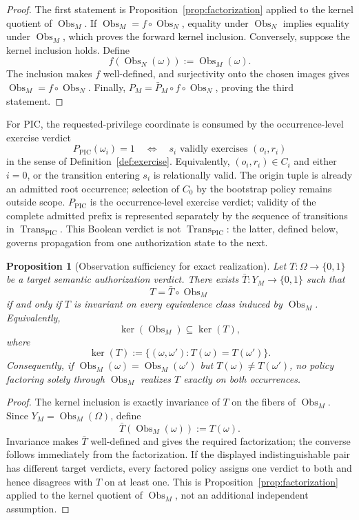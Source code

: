 \documentclass[10pt,twocolumn]{article}
\newtheorem{proposition}{Proposition}
\begin{document}
\begin{proof}
The first statement is Proposition~\ref{prop:factorization} applied to the
kernel quotient of \(\operatorname{Obs}_M\). If
\(\operatorname{Obs}_M=f\circ\operatorname{Obs}_N\), equality under
\(\operatorname{Obs}_N\) implies equality under \(\operatorname{Obs}_M\),
which proves the forward kernel inclusion. Conversely, suppose the kernel
inclusion holds. Define
\[
f(\operatorname{Obs}_N(\omega)):=\operatorname{Obs}_M(\omega).
\]
The inclusion makes \(f\) well-defined, and surjectivity onto the chosen images
gives \(\operatorname{Obs}_M=f\circ\operatorname{Obs}_N\). Finally,
\(P_M=\bar P_M\circ f\circ\operatorname{Obs}_N\), proving the third statement.
\end{proof}

For PIC, the requested-privilege coordinate is consumed by the occurrence-level
exercise verdict
\[
P_{\mathrm{PIC}}(\omega_i)=1
\quad\Longleftrightarrow\quad
s_i\text{ validly exercises }(o_i,r_i)
\]
in the sense of Definition~\ref{def:exercise}. Equivalently,
\((o_i,r_i)\in C_i\) and either \(i=0\), or the transition entering \(s_i\) is
relationally valid. The origin tuple is already an admitted root occurrence;
selection of \(C_0\) by the bootstrap policy remains outside scope.
\(P_{\mathrm{PIC}}\) is the occurrence-level exercise verdict; validity of the
complete admitted prefix is represented separately by the sequence of
transitions in \(\operatorname{Trans}_{\mathrm{PIC}}\). This
Boolean verdict is not \(\operatorname{Trans}_{\mathrm{PIC}}\): the latter,
defined below, governs propagation from one authorization state to the next.

\begin{proposition}[Observation sufficiency for exact realization]
\label{prop:observation-sufficiency}
Let \(T:\Omega\to\{0,1\}\) be a target semantic authorization verdict. There
exists \(\bar T:Y_M\to\{0,1\}\) such that
\[
T=\bar T\circ\operatorname{Obs}_M
\]
if and only if \(T\) is invariant on every equivalence class induced by
\(\operatorname{Obs}_M\). Equivalently,
\[
\ker(\operatorname{Obs}_M)\subseteq\ker(T),
\]
where
\[
\ker(T):=\{(\omega,\omega'):T(\omega)=T(\omega')\}.
\]
Consequently, if
\(\operatorname{Obs}_M(\omega)=\operatorname{Obs}_M(\omega')\) but
\(T(\omega)\neq T(\omega')\), no policy factoring solely through
\(\operatorname{Obs}_M\) realizes \(T\) exactly on both occurrences.
\end{proposition}

\begin{proof}
The kernel inclusion is exactly invariance of \(T\) on the fibers of
\(\operatorname{Obs}_M\). Since \(Y_M=\operatorname{Obs}_M(\Omega)\), define
\[
\bar T(\operatorname{Obs}_M(\omega)):=T(\omega).
\]
Invariance makes \(\bar T\) well-defined and gives the required factorization;
the converse follows immediately from the factorization. If the displayed
indistinguishable pair has different target verdicts, every factored policy
assigns one verdict to both and hence disagrees with \(T\) on at least one.
This is Proposition~\ref{prop:factorization} applied to the kernel quotient of
\(\operatorname{Obs}_M\), not an additional independent assumption.
\end{proof}
\end{document}
